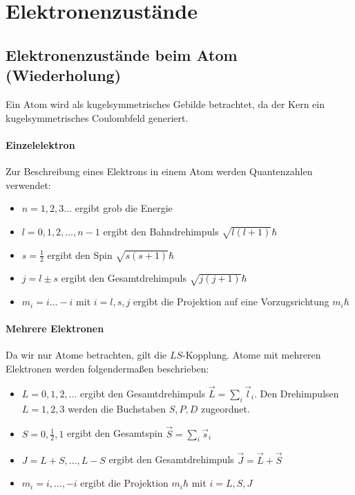 \setcounter{section}{4}
\setcounter{subsection}{4}
\setcounter{subsubsection}{3}
\setcounter{equation}{20}

\section{Elektronenzustände}
\subsection{Elektronenzustände beim Atom (Wiederholung)}
Ein Atom wird als kugelsymmetrisches Gebilde betrachtet, da der Kern ein kugelsymmetrisches Coulombfeld generiert.

\paragraph{Einzelelektron}
Zur Beschreibung eines Elektrons in einem Atom werden Quantenzahlen verwendet:
\begin{itemize}
	\item $n=1,2,3 \ldots$ ergibt grob die Energie
	\item $l=0,1,2,\ldots, n-1$ ergibt den Bahndrehimpuls $\sqrt{l(l+1)} \hbar $ 
	\item $s=\frac{1}{2}$ ergibt den Spin $\sqrt{s(s+1)} \hbar $ 
	\item $j= l \pm s$ ergibt den Gesamtdrehimpuls $\sqrt{j(j+1)} \hbar $
	\item $m_{i} = i\ldots -i$ mit $i=l,s,j$ ergibt die Projektion auf eine Vorzugsrichtung $m_{i} \hbar $
\end{itemize}

\paragraph{Mehrere Elektronen}
Da wir nur Atome betrachten, gilt die $LS$-Kopplung.
Atome mit mehreren Elektronen werden folgendermaßen beschrieben: 
\begin{itemize}
	\item $L = 0,1,2,\ldots$ ergibt den Gesamtdrehimpuls $\Vec{L} = \sum_{i}^{} \Vec{l}_{i}$. Den Drehimpulsen ${L=1,2,3}$ werden die Buchstaben $S,P,D$ zugeordnet.
	\item $S = 0,\frac{1}{2},1$ ergibt den Gesamtspin $\Vec{S} = \sum_{i}^{} \Vec{s}_{i} $ 
	\item $J= L+S , \ldots, L-S$ ergibt den Gesamtdrehimpuls $\Vec{J} = \Vec{L} + \Vec{S}$ 
	\item $m_{i} = i, \ldots, -i$ ergibt die Projektion $m_{i} \hbar $ mit $i= L, S, J$
\end{itemize}

